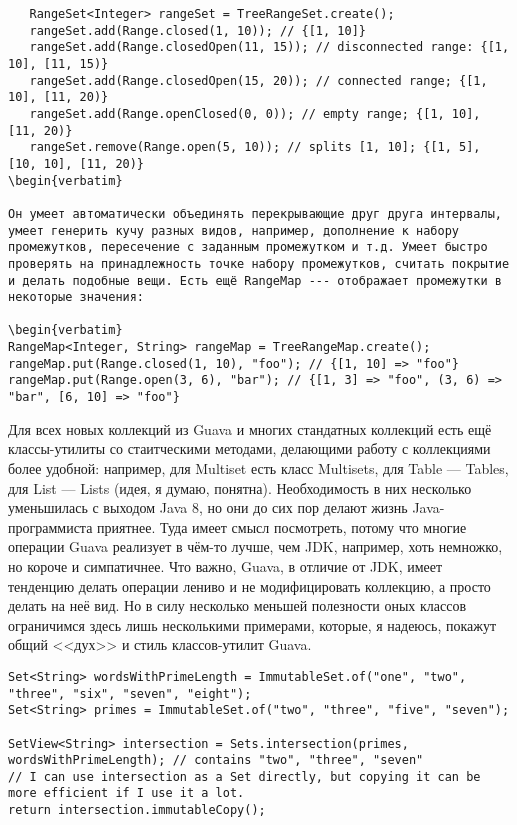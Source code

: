 \documentclass[a5paper,draft]{article}
\begin{document}
\begin{verbatim}
   RangeSet<Integer> rangeSet = TreeRangeSet.create();
   rangeSet.add(Range.closed(1, 10)); // {[1, 10]}
   rangeSet.add(Range.closedOpen(11, 15)); // disconnected range: {[1, 10], [11, 15)}
   rangeSet.add(Range.closedOpen(15, 20)); // connected range; {[1, 10], [11, 20)}
   rangeSet.add(Range.openClosed(0, 0)); // empty range; {[1, 10], [11, 20)}
   rangeSet.remove(Range.open(5, 10)); // splits [1, 10]; {[1, 5], [10, 10], [11, 20)}
\begin{verbatim}

Он умеет автоматически объединять перекрывающие друг друга интервалы, умеет генерить кучу разных видов, например, дополнение к набору промежутков, пересечение с заданным промежутком и т.д. Умеет быстро проверять на принадлежность точке набору промежутков, считать покрытие и делать подобные вещи. Есть ещё RangeMap --- отображает промежутки в некоторые значения:

\begin{verbatim}
RangeMap<Integer, String> rangeMap = TreeRangeMap.create();
rangeMap.put(Range.closed(1, 10), "foo"); // {[1, 10] => "foo"}
rangeMap.put(Range.open(3, 6), "bar"); // {[1, 3] => "foo", (3, 6) => "bar", [6, 10] => "foo"}
\end{verbatim}

Для всех новых коллекций из Guava и многих стандатных коллекций есть ещё классы-утилиты со стаитческими методами, делающими работу с коллекциями более удобной: например, для Multiset есть класс Multisets, для Table --- Tables, для List --- Lists (идея, я думаю, понятна). Необходимость в них несколько уменьшилась с выходом Java 8, но они до сих пор делают жизнь Java-программиста приятнее. Туда имеет смысл посмотреть, потому что многие операции Guava реализует в чём-то лучше, чем JDK, например, хоть немножко, но короче и симпатичнее. Что важно, Guava, в отличие от JDK, имеет тенденцию делать операции лениво и не модифицировать коллекцию, а просто делать на неё вид. Но в силу несколько меньшей полезности оных классов ограничимся здесь лишь несколькими примерами, которые, я надеюсь, покажут общий <<дух>> и стиль классов-утилит Guava.

\begin{verbatim}
Set<String> wordsWithPrimeLength = ImmutableSet.of("one", "two", "three", "six", "seven", "eight");
Set<String> primes = ImmutableSet.of("two", "three", "five", "seven");

SetView<String> intersection = Sets.intersection(primes, wordsWithPrimeLength); // contains "two", "three", "seven"
// I can use intersection as a Set directly, but copying it can be more efficient if I use it a lot.
return intersection.immutableCopy();
\end{verbatim}
\end{document}

